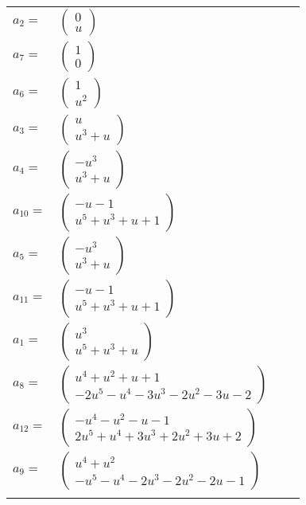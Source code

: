 \documentclass[1p]{elsarticle_modified}
\theoremstyle{definition}
\begin{document}
\begin{tabular}{m{7pt} m{180pt} m{7pt} m{180pt} }
\flushright $a_{2}=$&$\begin{pmatrix}0\\u\end{pmatrix}$ \\
\flushright $a_{7}=$&$\begin{pmatrix}1\\0\end{pmatrix}$ \\
\flushright $a_{6}=$&$\begin{pmatrix}1\\u^2\end{pmatrix}$ \\
\flushright $a_{3}=$&$\begin{pmatrix}u\\u^3+u\end{pmatrix}$ \\
\flushright $a_{4}=$&$\begin{pmatrix}- u^3\\u^3+u\end{pmatrix}$ \\
\flushright $a_{10}=$&$\begin{pmatrix}- u-1\\u^5+u^3+u+1\end{pmatrix}$ \\
\flushright $a_{5}=$&$\begin{pmatrix}- u^3\\u^3+u\end{pmatrix}$ \\
\flushright $a_{11}=$&$\begin{pmatrix}- u-1\\u^5+u^3+u+1\end{pmatrix}$ \\
\flushright $a_{1}=$&$\begin{pmatrix}u^3\\u^5+u^3+u\end{pmatrix}$ \\
\flushright $a_{8}=$&$\begin{pmatrix}u^4+u^2+u+1\\-2 u^5- u^4-3 u^3-2 u^2-3 u-2\end{pmatrix}$ \\
\flushright $a_{12}=$&$\begin{pmatrix}- u^4- u^2- u-1\\2 u^5+u^4+3 u^3+2 u^2+3 u+2\end{pmatrix}$ \\
\flushright $a_{9}=$&$\begin{pmatrix}u^4+u^2\\- u^5- u^4-2 u^3-2 u^2-2 u-1\end{pmatrix}$\\&\end{tabular}
\end{document}
